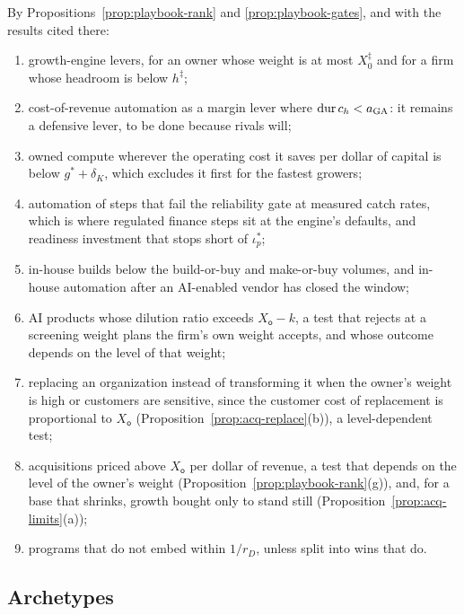 \begin{corollary}\label{cor:playbook-nopay}
By Propositions~\ref{prop:playbook-rank} and \ref{prop:playbook-gates}, and with the results cited there:
\begin{enumerate}
\item[(i)] growth-engine levers, for an owner whose weight is at most $X^\ddagger_0$ and for a firm whose headroom is below $h^\ddagger$;
\item[(ii)] cost-of-revenue automation as a margin lever where $\mathrm{dur}\,c_h<a_{\rm GA}$: it remains a defensive lever, to be done because rivals will;
\item[(iii)] owned compute wherever the operating cost it saves per dollar of capital is below $g^*+\delta_K$, which excludes it first for the fastest growers;
\item[(iv)] automation of steps that fail the reliability gate at measured catch rates, which is where regulated finance steps sit at the engine's defaults, and readiness investment that stops short of $\iota^*_p$;
\item[(v)] in-house builds below the build-or-buy and make-or-buy volumes, and in-house automation after an AI-enabled vendor has closed the window;
\item[(vi)] AI products whose dilution ratio exceeds $X_{\mathsf o}-k$, a test that rejects at a screening weight plans the firm's own weight accepts, and whose outcome depends on the level of that weight; %
\item[(vii)] replacing an organization instead of transforming it when the owner's weight is high or customers are sensitive, since the customer cost of replacement is proportional to $X_{\mathsf o}$ (Proposition~\ref{prop:acq-replace}(b)), a level-dependent test; %
\item[(viii)] acquisitions priced above $X_{\mathsf o}$ per dollar of revenue, a test that depends on the level of the owner's weight (Proposition~\ref{prop:playbook-rank}(g)), and, for a base that shrinks, growth bought only to stand still (Proposition~\ref{prop:acq-limits}(a)); %
\item[(ix)] programs that do not embed within $1/r_D$, unless split into wins that do.
\end{enumerate}
\end{corollary}

\subsection{Archetypes}\label{sec:playbook-archetypes}

